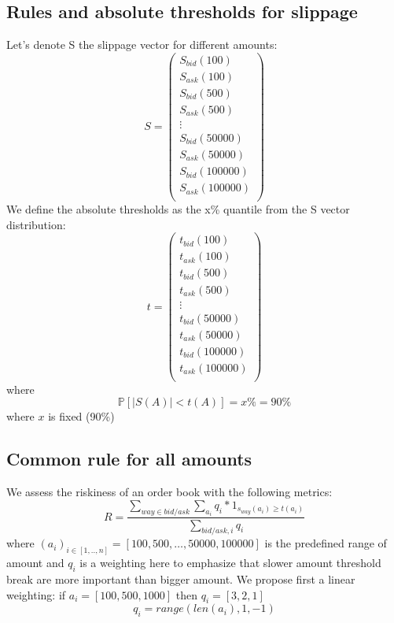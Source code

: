\documentclass[conference]{IEEEtran}
\begin{document}
\subsection{Rules and absolute thresholds for slippage}

Let's denote S the slippage vector for different amounts:
$$
S =\begin{pmatrix} 
	S_{bid}(100) \\
	S_{ask}(100) \\
	S_{bid}(500) \\
	S_{ask}(500) \\
	\vdots\\
	S_{bid}(50000) \\
	S_{ask}(50000) \\
	S_{bid}(100000) \\
	S_{ask}(100000) \\
	\end{pmatrix}
$$
We define the absolute thresholds as the x\% quantile from the S vector distribution:
\begin{equation}
t =\begin{pmatrix} 
	t_{bid}(100) \\
	t_{ask}(100) \\
	t_{bid}(500) \\
	t_{ask}(500) \\
	\vdots\\
	t_{bid}(50000) \\
	t_{ask}(50000) \\
	t_{bid}(100000) \\
	t_{ask}(100000) \\
	\end{pmatrix}
\end{equation}
where $$\mathbb{P}\left[\lvert S(A) \rvert < t(A) \right] = x\% = 90\%$$ where $x$ is fixed (90\%)
\subsection{Common rule for all amounts}
We assess the riskiness of an order book with the following metrics:
\begin{equation}
R = \frac{\sum\limits_{way \in bid/ask}\sum\limits_{a_i} q_i * 1_{s_{way}(a_i)\ge t(a_i)}}{\sum\limits_{bid/ask,i} q_i}
\end{equation}
where $ (a_i)_{i \in [1,..,n]} = [100, 500, \hdots, 50000,100000]$ is the predefined range of amount 
and $q_i$ is a weighting here to emphasize that slower amount threshold break are more important than bigger amount. We propose first a linear weighting: if $a_i = [100,500,1000]$ then $q_i = [3,2,1]$
$$
q_i = range(len(a_i),1,-1)
$$
\end{document}
